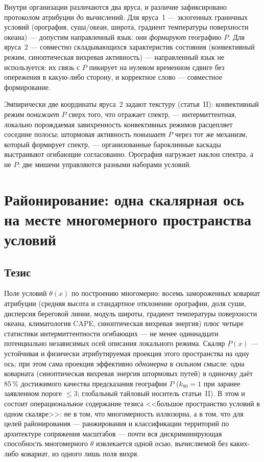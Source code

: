 \documentclass[11pt,a4paper]{article}
\begin{document}
Внутри организации различаются два яруса, и различие зафиксировано протоколом атрибуции \emph{до} вычислений. Для яруса~1 --- экзогенных граничных условий (орография, суша/океан, широта, градиент температуры поверхности океана) --- допустим направленный язык: они \emph{формируют} географию $P$. Для яруса~2 --- совместно складывающихся характеристик состояния (конвективный режим, синоптическая вихревая активность) --- направленный язык не используется: их связь с $P$ пикирует на нулевом временном сдвиге без опережения в какую-либо сторону, и корректное слово --- совместное формирование.

Эмпирически две координаты яруса~2 задают текстуру (статья~II): конвективный режим \emph{понижает} $P$ сверх того, что отражает спектр, --- интермиттентная, локально порождаемая завихренность конвективных режимов расцепляет соседние полосы; штормовая активность \emph{повышает} $P$ через тот же механизм, который формирует спектр, --- организованные бароклинные каскады выстраивают огибающие согласованно. Орография нагружает наклон спектра, а не $P$: две мишени управляются разными наборами условий.

\section{Районирование: одна скалярная ось на месте многомерного пространства условий}
\label{sec:zoning}

\subsection{Тезис}

Поле условий $\theta(x)$ по построению многомерно: восемь замороженных ковариат атрибуции (средняя высота и стандартное отклонение орографии, доля суши, дисперсия береговой линии, модуль широты, градиент температуры поверхности океана, климатология CAPE, синоптическая вихревая энергия) плюс четыре статистики интермиттентности огибающих --- не менее одиннадцати потенциально независимых осей описания локального режима. Скаляр $P(x)$ --- устойчивая и физически атрибутируемая проекция этого пространства на одну ось; при этом сама проекция эффективно \emph{одномерна} в сильном смысле: одна ковариата (синоптическая вихревая энергия штормовых путей) в одиночку даёт 85\,\% достижимого качества предсказания географии $P$ ($k_{80}=1$ при заранее заявленном пороге $\le3$; глобальный тайловый носитель статьи~II). В этом и состоит операциональное содержание тезиса <<большое пространство условий в одном скаляре>>: не в том, что многомерность иллюзорна, а в том, что для целей районирования --- ранжирования и классификации территорий по архитектуре сопряжения масштабов --- почти вся дискриминирующая способность многомерного $\theta$ извлекается одной осью, вычисляемой без каких-либо ковариат, из одного лишь поля вихря.
\end{document}
